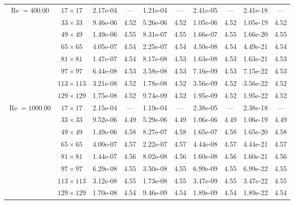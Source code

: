 \documentclass[preprint, 12pt]{elsarticle}
\begin{document}
\begin{center}
\begin{table}[H]
{\begin{tabular*}{\textwidth}{@{\extracolsep\fill}cccccccccc@{}}
    \hline
    \multirow{7}{*}{$\operatorname{Re}=400.00$} & $17\times 17$ & 2.17e-04 & --- & 1.21e-04 & --- & 2.41e-05 & --- & 2.41e-18 & --- \\
    & $33\times 33$ & 9.46e-06 & 4.52 & 5.26e-06 & 4.52 & 1.05e-06 & 4.52 & 1.05e-19 & 4.52 \\
    & $49\times 49$ & 1.49e-06 & 4.55 & 8.31e-07 & 4.55 & 1.66e-07 & 4.55 & 1.66e-20 & 4.55 \\
    \multirow{3}{*}{$\operatorname{Wi}=10$} & $65\times 65$ & 4.05e-07 & 4.54 & 2.25e-07 & 4.54 & 4.50e-08 & 4.54 & 4.49e-21 & 4.54 \\
    & $81\times 81$ & 1.47e-07 & 4.54 & 8.17e-08 & 4.53 & 1.63e-08 & 4.53 & 1.63e-21 & 4.53 \\
    & $97\times 97$ & 6.44e-08 & 4.53 & 3.58e-08 & 4.53 & 7.16e-09 & 4.53 & 7.15e-22 & 4.53 \\
    & $113\times 113$ & 3.21e-08 & 4.52 & 1.78e-08 & 4.52 & 3.56e-09 & 4.52 & 3.56e-22 & 4.52 \\
    & $129\times 129$ & 1.75e-08 & 4.52 & 9.74e-09 & 4.52 & 1.95e-09 & 4.52 & 1.95e-22 & 4.52 \\
    \hline
    \multirow{7}{*}{$\operatorname{Re}=1000.00$} & $17\times 17$ & 2.15e-04 & --- & 1.19e-04 & --- & 2.38e-05 & --- & 2.38e-18 & --- \\
    & $33\times 33$ & 9.52e-06 & 4.49 & 5.29e-06 & 4.49 & 1.06e-06 & 4.49 & 1.06e-19 & 4.49 \\
    & $49\times 49$ & 1.49e-06 & 4.58 & 8.27e-07 & 4.58 & 1.65e-07 & 4.58 & 1.65e-20 & 4.58 \\
    \multirow{3}{*}{$\operatorname{Wi}=10$} & $65\times 65$ & 4.00e-07 & 4.57 & 2.22e-07 & 4.57 & 4.44e-08 & 4.57 & 4.44e-21 & 4.57 \\
    & $81\times 81$ & 1.44e-07 & 4.56 & 8.02e-08 & 4.56 & 1.60e-08 & 4.56 & 1.60e-21 & 4.56 \\
    & $97\times 97$ & 6.29e-08 & 4.55 & 3.50e-08 & 4.55 & 6.99e-09 & 4.55 & 6.99e-22 & 4.55 \\
    & $113\times 113$ & 3.12e-08 & 4.55 & 1.73e-08 & 4.55 & 3.47e-09 & 4.55 & 3.47e-22 & 4.55 \\
    & $129\times 129$ & 1.70e-08 & 4.54 & 9.46e-09 & 4.54 & 1.89e-09 & 4.54 & 1.89e-22 & 4.54 \\
    \hline
    \end{tabular*}
}
\end{table}
\end{center}
\end{document}
